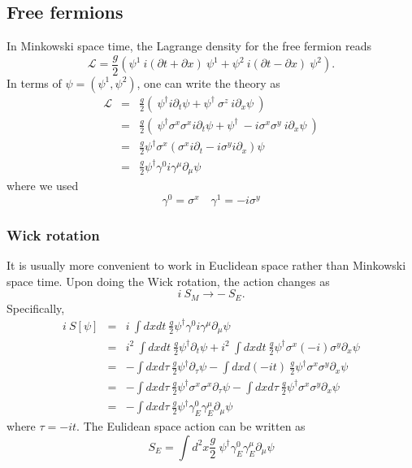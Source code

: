 \documentclass[submission, PhysLectNotes]{SciPost}
\begin{document}
\subsection{Free fermions}
In Minkowski space time, the Lagrange density for the free fermion reads
\begin{equation}
    \mathcal{L} = \frac{g}{2}\left(\psi^1\ i(\partial t + \partial x)\ \psi^1 + \psi^2\ i(\partial t - \partial x)\ \psi^2 \right).
\end{equation}
In terms of $\psi = (\psi^1,\psi^2)$, one can write the theory as
\begin{eqnarray}
    \mathcal{L} &=& \frac{g}{2} \left ( \ \psi^\dagger i\partial_t \psi + \psi^\dagger \ \sigma^z \ i\partial_x \psi \ \right) \nonumber \\
    &=& \frac{g}{2} \left ( \ \psi^\dagger \sigma^x\sigma^x i\partial_t \psi + \psi^\dagger \ -i\sigma^x\sigma^y \ i\partial_x \psi \ \right) \nonumber\\
    &=& \frac{g}{2} \psi^\dagger \sigma^x \left(\sigma^x i \partial_t - i\sigma^y i\partial_x \right) \psi \nonumber \\
    &=& \frac{g}{2} \psi^\dagger \gamma^0 i\gamma^\mu \partial_\mu \psi
\end{eqnarray}
where we used 
\begin{equation}
    \gamma^0 = \sigma^x \quad \gamma^1 = -i\sigma^y
\end{equation}

\subsubsection{Wick rotation}
It is usually more convenient to work in Euclidean space rather than Minkowski space time. Upon doing the Wick rotation, the action changes as 
\begin{equation}
    i\ S_M \rightarrow -\ S_E.
\end{equation}
Specifically, 
\begin{eqnarray}
    i\ S[\psi] &=& i\ \int dxdt \ \frac{g}{2} \psi^\dagger \gamma^0 i\gamma^\mu \partial_\mu \psi \nonumber \\
    &=& i^2 \ \int dxdt \ \frac{g}{2} \psi^\dagger \partial_t \psi + i^2 \ \int dxdt \ \frac{g}{2} \psi^\dagger \sigma^x (-i) \sigma^y \partial_x \psi \nonumber \\
    &=& -\int dxd\tau \ \frac{g}{2} \psi^\dagger \partial_\tau \psi - \int dxd(-i t) \ \frac{g}{2} \psi^\dagger \sigma^x \sigma^y \partial_x \psi \nonumber \\
    &=&  -\int dxd\tau \ \frac{g}{2} \psi^\dagger \sigma^x\sigma^x\partial_\tau \psi - \int dxd\tau \ \frac{g}{2} \psi^\dagger \sigma^x \sigma^y \partial_x \psi \nonumber \\
    &=&  -\int dxd\tau \ \frac{g}{2} \psi^\dagger \gamma^0_E\gamma^\mu_E\partial_\mu \psi
\end{eqnarray}
where $\tau = -it$. The Eulidean space action can be written as
\begin{equation}
    S_E = \int d^2x \frac{g}{2} \ \psi^\dagger \gamma^0_E\gamma^\mu_E\partial_\mu \psi
\end{equation}
\end{document}
